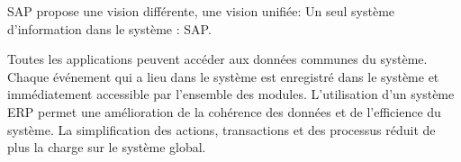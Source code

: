 SAP propose une vision différente, une vision unifiée: Un seul système d'information dans le système : SAP. 

Toutes les applications peuvent accéder aux données communes du système. Chaque événement qui a lieu dans le système est enregistré dans le système et immédiatement accessible par l'ensemble des modules. L'utilisation d'un système ERP permet une amélioration de la cohérence des données et de l'efficience du système. La simplification des actions, transactions et des processus réduit de plus la charge sur le système global. 

\clearpage